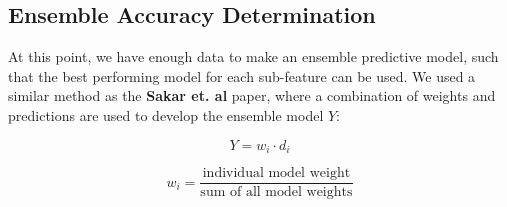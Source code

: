 \documentclass[
]{article}
\begin{document}
\newpage

\hypertarget{ensemble-accuracy-determination}{%
\subsection{Ensemble Accuracy Determination}\label{ensemble-accuracy-determination}}

At this point, we have enough data to make an ensemble predictive model, such that the best performing model for each sub-feature can be used. We used a similar method as the \textbf{Sakar et. al} paper, where a combination of weights and predictions are used to develop the ensemble model \(Y\):

\begin{equation}
Y = w_i \cdot d_i
\label{eq:weighted_sum}
\end{equation}

\begin{equation}
w_i = \frac{\text{individual model weight}}{\text{sum of all model weights}}
\end{equation}
\end{document}
